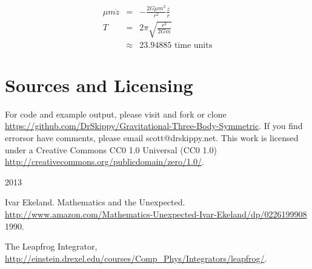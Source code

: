\documentclass{article}
\begin{document}
\begin{eqnarray}
\mu m \ddot{z} & = &  - \frac{2G \mu m^2}{r^2} \frac{z}{r} \\
T & = & 2\pi \sqrt{\frac{r^3}{2G m}} \\
& \approx & 23.94885 \text{  time units}
\label{eq:small}
\end{eqnarray}

%
%
%




\section{Sources and Licensing} 

For code and example output, please visit and fork or clone \url{https://github.com/DrSkippy/Gravitational-Three-Body-Symmetric}.
\noindent If you find errorsor have comments, please email scott@drskippy.net.
\noindent This work is licensed under a Creative Commons CC0 1.0 Universal (CC0 1.0) 
\noindent \url{http://creativecommons.org/publicdomain/zero/1.0/}.


\begin{thebibliography}{2013}

 Ivar Ekeland. Mathematics and the Unexpected.  \url{http://www.amazon.com/Mathematics-Unexpected-Ivar-Ekeland/dp/0226199908} 1990.

 The Leapfrog Integrator, \url{http://einstein.drexel.edu/courses/Comp_Phys/Integrators/leapfrog/}.

\end{thebibliography}
\end{document}
